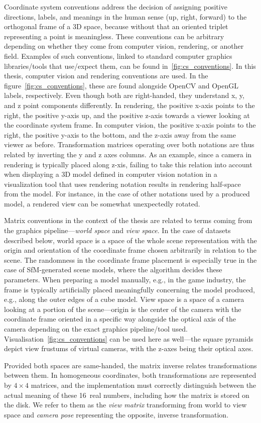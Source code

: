 Coordinate system conventions address the decision of assigning positive directions,
labels, and meanings in the human sense (up, right, forward) to the orthogonal frame of a
3D space, because without that an oriented triplet representing a point is meaningless.
These conventions can be arbitrary depending on whether they come from computer vision,
rendering, or another field. Examples of such conventions, linked to standard computer
graphics libraries/tools that use/expect them, can be found in~\cref{fig:cs_conventions}.
In this thesis, computer vision and rendering conventions are used. In the
figure~\cref{fig:cs_conventions}, these are found alongside OpenCV and OpenGL labels,
respectively. Even though both are right-handed, they understand x, y, and z point
components differently.  In rendering, the positive x-axis points to the right, the
positive y-axis up, and the positive z-axis towards a viewer looking at the coordinate
system frame. In computer vision, the positive x-axis points to the right, the positive
y-axis to the bottom, and the z-axis away from the same viewer as before. Transformation
matrices operating over both notations are thus related by inverting the y and z axes
columns. As an example, since a camera in rendering is typically placed along z-xis,
failing to take this relation into account when displaying a 3D model defined in computer
vision notation in a visualization tool that uses rendering notation results in rendering
half-space  from the model. For instance, in the case of other notations used by
a produced model, a rendered view can be somewhat unexpectedly rotated.

Matrix conventions in the context of the thesis are related to terms coming from the
graphics pipeline---\emph{world space} and \emph{view space}. In the case of datasets
described below, world space is a space of the whole scene representation with the origin
and orientation of the coordinate frame chosen arbitrarily in relation to the scene.  The
randomness in the coordinate frame placement is especially true in the case of
SfM-generated scene models, where the algorithm decides these parameters.  When preparing
a model manually, e.g., in the game industry, the frame is typically artificially placed
meaningfully concerning the model produced, e.g., along the outer edges of a cube model.
View space is a space of a camera looking at a portion of the scene---origin is the center
of the camera with the coordinate frame oriented in a specific way alongside the optical
axis of the camera depending on the exact graphics pipeline/tool used.
Visualisation~\cref{fig:cs_conventions} can be used here as well---the square pyramids
depict view frustums of virtual cameras, with the z-axes being their optical axes.

Provided both spaces are same-handed, the matrix inverse relates transformations between
them. In homogeneous coordinates, both transformations are represented by $4\times4$
matrices, and the implementation must correctly distinguish between the actual meaning of
these 16~real numbers, including how the matrix is stored on the disk. We refer to them as
the \emph{view matrix} transforming from world to view space and \emph{camera pose}
representing the opposite, inverse transformation.
